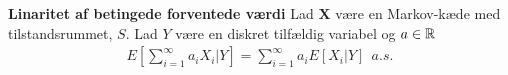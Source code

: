 \section{}\label{bilag:linaritet}
\begin{minipage}\textwidth
\begin{thmx} \textbf{Linaritet af betingede forventede værdi} %
\newline
Lad $\bm X$ være en Markov-kæde med tilstandsrummet, $S$. Lad $Y$ være en diskret tilfældig variabel og $a\in \mathbb{R}$
\begin{align*}
    E\left[\sum_{i=1}^\infty a_i X_i | Y\right] =  \sum_{i=1}^\infty a_i E\left[X_i |Y\right] \ \ a.s.
\end{align*}
\end{thmx}
\end{minipage}
